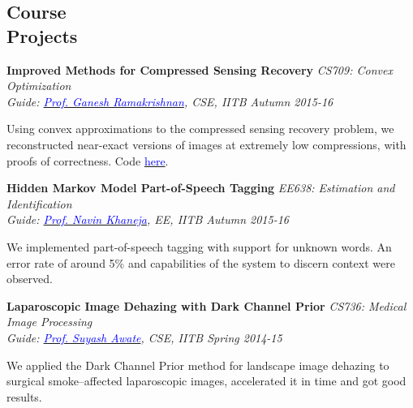 \documentclass[margin,line]{res}
\newenvironment{list1}{
  \begin{list}{\ding{113}}{%
      \setlength{\itemsep}{0in}
      \setlength{\parsep}{0in} \setlength{\parskip}{0in}
      \setlength{\topsep}{0in} \setlength{\partopsep}{0in} 
      \setlength{\leftmargin}{0.17in}}}{\end{list}}
\begin{document}
\begin{resume}
\section{\sc Course \\Projects}
{\bf Improved Methods for Compressed Sensing Recovery} \hfill {\it CS709: Convex Optimization} \\
{\em Guide: \href{https://www.cse.iitb.ac.in/~ganesh/}{\textcolor{blue}{Prof. Ganesh Ramakrishnan}}, CSE, IITB \hfill Autumn 2015-16} \\
\vspace*{-.15in}
\begin{list1}
\item[] Using convex approximations to the compressed sensing recovery problem, we reconstructed near-exact versions of images at extremely low compressions, with proofs of correctness. Code \href{https://github.com/alankarkotwal/cs-rank-minimization}{\textcolor{blue} {here}}.
\end{list1}

\vspace*{-0.13in}

{\bf Hidden Markov Model Part-of-Speech Tagging} \hfill \textit{EE638: Estimation and Identification} \\
{\em Guide: \href{https://www.ee.iitb.ac.in/course/~ee638/Navin}{\textcolor{blue}{Prof. Navin Khaneja}}, EE, IITB \hfill Autumn 2015-16} \\
\vspace*{-.15in}
\begin{list1}
\item[] We implemented part-of-speech tagging with support for unknown words. An error rate of around 5\% and capabilities of the system to discern context were observed.
\end{list1}

\vspace*{-0.13in}

{\bf Laparoscopic Image Dehazing with Dark Channel Prior} \hfill \textit{CS736: Medical Image Processing} \\
{\em Guide: \href{https://www.cse.iitb.ac.in/~suyash}{\textcolor{blue}{Prof. Suyash Awate}}, CSE, IITB \hfill Spring 2014-15} \\
\vspace*{-.15in}
\begin{list1}
\item[] We applied the Dark Channel Prior method for landscape image dehazing to surgical smoke--affected laparoscopic images, accelerated it in time and got good results.
\end{list1}


\end{resume}
\end{document}

